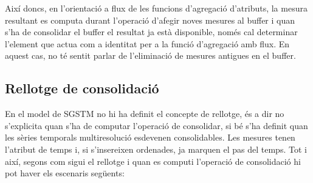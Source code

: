 Així doncs, en l'orientació a flux de les funcions d'agregació
d'atributs, la mesura resultant es computa durant l'operació d'afegir
noves mesures al buffer i quan s'ha de consolidar el buffer el
resultat ja està disponible, només cal determinar l'element que actua
com a identitat per a la funció d'agregació amb flux.  En aquest cas,
no té sentit parlar de l'eliminació de mesures antigues en el buffer.










\subsection{Rellotge de consolidació}


En el model de \gls{SGSTM} no hi ha definit el concepte de rellotge,
és a dir no s'explicita quan s'ha de computar l'operació de
consolidar, si bé s'ha definit quan les sèries temporals
multiresolució esdevenen consolidables.  Les mesures tenen l'atribut
de temps i, si s'insereixen ordenades, ja marquen el pas del temps.
Tot i així, segons com sigui el rellotge i quan es computi l'operació
de consolidació hi pot haver els escenaris següents:

